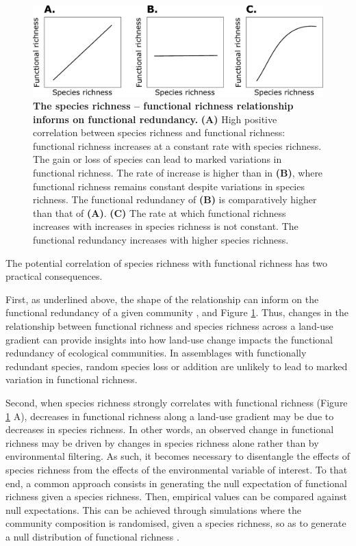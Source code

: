 \begin{figure}[h!]
\centering
\includegraphics[scale=0.7]{figures/chapter1/FRedundancy}
\caption[The species richness -- functional richness relationship informs on functional redundancy.]{\textbf{The species richness -- functional richness relationship informs on functional redundancy.} \textbf{(A)} High positive correlation between species richness and functional richness: functional richness increases at a constant rate with species richness. The gain or loss of species can lead to marked variations in functional richness. The rate of increase is higher than in \textbf{(B)}, where functional richness remains constant despite variations in species richness. The functional redundancy of \textbf{(B)} is comparatively higher than that of \textbf{(A)}. \textbf{(C)} The rate at which functional richness increases with increases in species richness is not constant. The functional redundancy increases with higher species richness.} 
\label{fredundancy_ltr}
\end{figure}

The potential correlation of species richness with functional richness has two practical consequences. 

First, as underlined above, the shape of the relationship can inform on the functional redundancy of a given community \citep{Cadotte2011}, and Figure \ref{fredundancy_ltr}. Thus, changes in the relationship between functional richness and species richness across a land-use gradient can provide insights into how land-use change impacts the functional redundancy of ecological communities. In assemblages with functionally redundant species, random species loss or addition are unlikely to lead to marked variation in functional richness.

Second, when species richness strongly correlates with functional richness (Figure \ref{fredundancy_ltr} A), decreases in functional richness along a land-use gradient may be due to decreases in species richness. In other words, an observed change in functional richness may be driven by changes in species richness alone rather than by environmental filtering. As such, it becomes necessary to disentangle the effects of species richness from the effects of the environmental variable of interest. To that end, a common approach consists in generating the null expectation of functional richness given a species richness. Then, empirical values can be compared against null expectations. This can be achieved through simulations where the community composition is randomised, given a species richness, so as to generate a null distribution of functional richness \citep{Wong2018, Flynn2009}.

